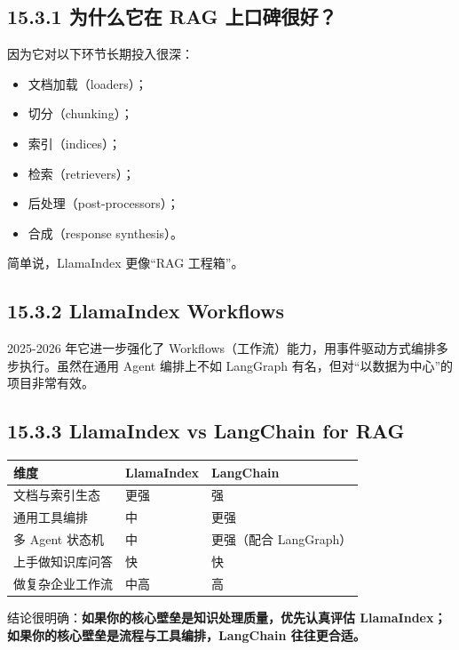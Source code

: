 \subsection{15.3.1 为什么它在 RAG 上口碑很好？}

因为它对以下环节长期投入很深：


\begin{itemize}[leftmargin=2em]
\item 文档加载（loaders）；
\item 切分（chunking）；
\item 索引（indices）；
\item 检索（retrievers）；
\item 后处理（post-processors）；
\item 合成（response synthesis）。
\end{itemize}

简单说，LlamaIndex 更像``RAG 工程箱''。


\subsection{15.3.2 LlamaIndex Workflows}

2025-2026 年它进一步强化了 Workflows（工作流）能力，用事件驱动方式编排多步执行。虽然在通用 Agent 编排上不如 LangGraph 有名，但对``以数据为中心''的项目非常有效。


\subsection{15.3.3 LlamaIndex vs LangChain for RAG}

\begingroup
\scriptsize
\setlength{\tabcolsep}{3pt}
\begin{longtable}{|p{}|p{}|p{}|}
\hline
维度 & LlamaIndex & LangChain \\ \hline
文档与索引生态 & 更强 & 强 \\ \hline
通用工具编排 & 中 & 更强 \\ \hline
多 Agent 状态机 & 中 & 更强（配合 LangGraph） \\ \hline
上手做知识库问答 & 快 & 快 \\ \hline
做复杂企业工作流 & 中高 & 高 \\ \hline
\end{longtable}
\endgroup

结论很明确：\textbf{如果你的核心壁垒是知识处理质量，优先认真评估 LlamaIndex；如果你的核心壁垒是流程与工具编排，LangChain 往往更合适。}


